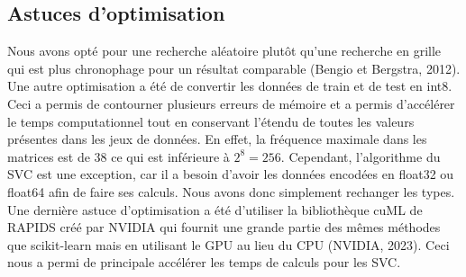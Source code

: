 \documentclass{article}
\begin{document}
\subsection{Astuces d'optimisation}
Nous avons opté pour une recherche aléatoire plutôt qu'une recherche en grille qui est plus chronophage pour un résultat comparable (Bengio et Bergstra, 2012). Une autre optimisation a été de convertir les données de train et de test en int8. Ceci a permis de contourner plusieurs erreurs de mémoire et a permis d'accélérer le temps computationnel tout en conservant l'étendu de toutes les valeurs présentes dans les jeux de données. En effet, la fréquence maximale dans les matrices est de 38 ce qui est inférieure à $2^8=256$. Cependant, l'algorithme du SVC est une exception, car il a besoin d'avoir les données encodées en float32 ou float64 afin de faire ses calculs. Nous avons donc simplement rechanger les types. Une dernière astuce d'optimisation a été d'utiliser la bibliothèque cuML de RAPIDS créé par NVIDIA qui fournit une grande partie des mêmes méthodes que scikit-learn mais en utilisant le GPU au lieu du CPU (NVIDIA, 2023). Ceci nous a permi de principale accélérer les temps de calculs pour les SVC.
\end{document}
